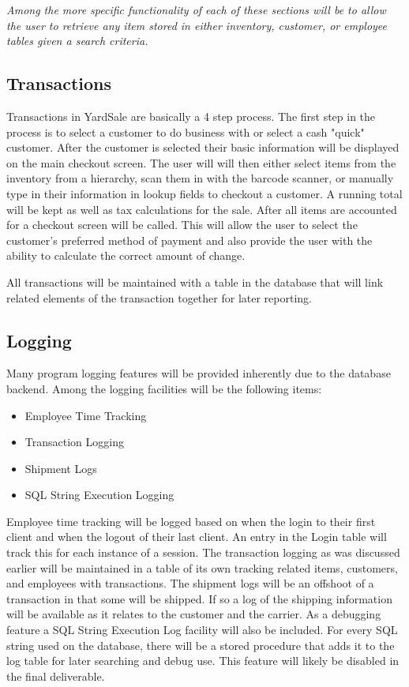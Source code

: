\documentclass{report}
\begin{document}
    {\sl Among the more specific functionality of each of these sections
    will be to allow the user to retrieve any item stored in either
    inventory, customer, or employee tables given a search
    criteria.}

    \subsection{Transactions}

    Transactions in YardSale are basically a 4 step process. The first
    step in the process is to select a customer to do business with or
    select a cash "quick" customer. After the customer is selected
    their basic information will be displayed on the main checkout
    screen. The user will will then either select items from the
    inventory from a hierarchy, scan them in with the barcode scanner,
    or manually type in their information in lookup fields to checkout
    a customer. A running total will be kept as well as tax
    calculations for the sale. After all items are accounted for a
    checkout screen will be called. This will allow the user to select
    the customer's preferred method of payment and also provide the
    user with the ability to calculate the correct amount of change.

    All transactions will be maintained with a table in the database
    that will link related elements of the transaction together for
    later reporting.

    \subsection{Logging}
    Many program logging features will be provided inherently due to
    the database backend. Among the logging facilities will be the
    following items:

    \begin{itemize}
        \item {Employee Time Tracking}
        \item {Transaction Logging}
        \item {Shipment Logs}
        \item {SQL String Execution Logging}
    \end{itemize}

    Employee time tracking will be logged based on when the login to
    their first client and when the logout of their last client. An
    entry in the Login table will track this for each instance of a
    session. The transaction logging as was discussed earlier will be
    maintained in a table of its own tracking related items,
    customers, and employees with transactions. The shipment logs will
    be an offshoot of a transaction in that some will be shipped. If
    so a log of the shipping information will be available as it
    relates to the customer and the carrier. As a debugging feature a
    SQL String Execution Log facility will also be included. For every
    SQL string used on the database, there will be a stored procedure
    that adds it to the log table for later searching and debug use.
    This feature will likely be disabled in the final deliverable.
\end{document}
